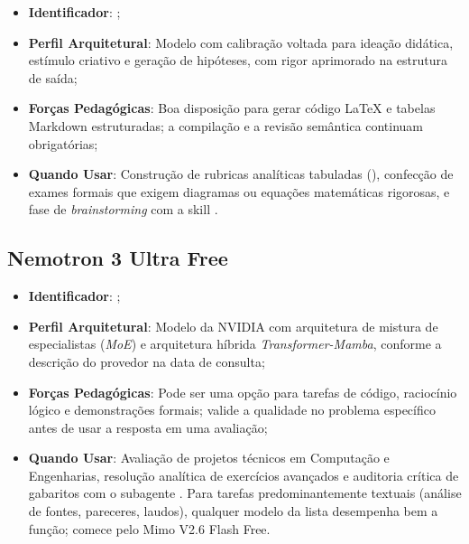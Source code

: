 \begin{itemize}
  \item \textbf{Identificador}: ;
  \item \textbf{Perfil Arquitetural}: Modelo com calibra{\c c}{\~a}o voltada para idea{\c c}{\~a}o did{\'a}tica, est{\'i}mulo criativo e gera{\c c}{\~a}o de hip{\'o}teses, com rigor aprimorado na estrutura de sa{\'i}da;
   \item \textbf{For{\c c}as Pedag{\'o}gicas}: Boa disposi{\c c}{\~a}o para gerar c{\'o}digo \LaTeX{} e tabelas Markdown estruturadas; a compila{\c c}{\~a}o e a revis{\~a}o sem{\^a}ntica continuam obrigat{\'o}rias;
  \item \textbf{Quando Usar}: Constru{\c c}{\~a}o de rubricas anal{\'i}ticas tabuladas (), confec{\c c}{\~a}o de exames formais que exigem diagramas ou equa{\c c}{\~o}es matem{\'a}ticas rigorosas, e fase de \emph{brainstorming} com a skill .
\end{itemize}

\subsection{Nemotron 3 Ultra Free}

\begin{itemize}
  \item \textbf{Identificador}: ;
   \item \textbf{Perfil Arquitetural}: Modelo da NVIDIA com arquitetura de mistura de especialistas (\emph{MoE}) e arquitetura h{\'i}brida \emph{Transformer-Mamba}, conforme a descri{\c c}{\~a}o do provedor na data de consulta;
   \item \textbf{For{\c c}as Pedag{\'o}gicas}: Pode ser uma op{\c c}{\~a}o para tarefas de c{\'o}digo, racioc{\'i}nio l{\'o}gico e demonstra{\c c}{\~o}es formais; valide a qualidade no problema espec{\'i}fico antes de usar a resposta em uma avalia{\c c}{\~a}o;
   \item \textbf{Quando Usar}: Avalia{\c c}{\~a}o de projetos t{\'e}cnicos em Computa{\c c}{\~a}o e Engenharias, resolu{\c c}{\~a}o anal{\'i}tica de exerc{\'i}cios avan{\c c}ados e auditoria cr{\'i}tica de gabaritos com o subagente . Para tarefas predominantemente textuais (an{\'a}lise de fontes, pareceres, laudos), qualquer modelo da lista desempenha bem a fun{\c c}{\~a}o; comece pelo Mimo V2.6 Flash Free.
\end{itemize}

